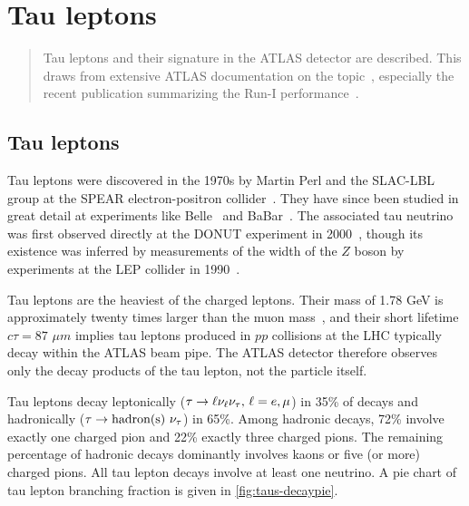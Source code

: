 \chapter[Tau leptons][Tau leptons]{Tau leptons}
\label{chap:taus}

\begin{quote}
  Tau leptons and their signature in the ATLAS detector are described. This draws from extensive ATLAS documentation on the topic~\cite{ATLAS-CONF-2012-142,ATLAS-CONF-2013-064,ATLAS-CONF-2013-044}, especially the recent publication summarizing the Run-I performance~\cite{PERF-2013-06}.
\end{quote}


\section{Tau leptons}
\label{sec:taus-theory}

Tau leptons were discovered in the 1970s by Martin Perl and the SLAC-LBL group at the SPEAR electron-positron collider~\cite{1975.Perl.discovery_of_tau_1,1976.Perl.discovery_of_tau_2,1977.Perl.discovery_of_tau_3}. They have since been studied in great detail at experiments like Belle~\cite{2014.belle.tau-lifetime} and BaBar~\cite{2009.babar.tau-mass}. The associated tau neutrino was first observed directly at the DONUT experiment in 2000~\cite{2001.Kodama.discovery_of_tau_neutrino}, though its existence was inferred by measurements of the width of the $Z$ boson by experiments at the LEP collider in 1990~\cite{1990.ALEPH.3-neutrino-families}.

Tau leptons are the heaviest of the charged leptons. Their mass of 1.78 GeV is approximately twenty times larger than the muon mass~\cite{2012.PDG}, and their short lifetime $c\tau = \text{87 } \mu m$ implies tau leptons produced in $pp$ collisions at the LHC typically decay within the ATLAS beam pipe. The ATLAS detector therefore observes only the decay products of the tau lepton, not the particle itself.

Tau leptons decay leptonically ($\tau \rightarrow \ell\nu_\ell\nu_\tau \text{, } \ell = e,\mu$) in 35\% of decays and hadronically ($\tau \rightarrow \text{hadron(s) }\nu_\tau$) in 65\%. Among hadronic decays, 72\% involve exactly one charged pion and 22\% exactly three charged pions. The remaining percentage of hadronic decays dominantly involves kaons or five (or more) charged pions. All tau lepton decays involve at least one neutrino. A pie chart of tau lepton branching fraction is given in \cref{fig:taus-decaypie}.

